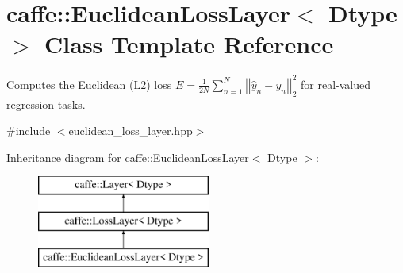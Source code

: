 \hypertarget{classcaffe_1_1EuclideanLossLayer}{}\section{caffe\+:\+:Euclidean\+Loss\+Layer$<$ Dtype $>$ Class Template Reference}
\label{classcaffe_1_1EuclideanLossLayer}


Computes the Euclidean (L2) loss $ E = \frac{1}{2N} \sum\limits_{n=1}^N \left| \left| \hat{y}_n - y_n \right| \right|_2^2 $ for real-\/valued regression tasks.  




{\ttfamily \#include $<$euclidean\+\_\+loss\+\_\+layer.\+hpp$>$}

Inheritance diagram for caffe\+:\+:Euclidean\+Loss\+Layer$<$ Dtype $>$\+:\begin{figure}[H]
\begin{center}
\leavevmode
\includegraphics[height=3.000000cm]{classcaffe_1_1EuclideanLossLayer}
\end{center}
\end{figure}
